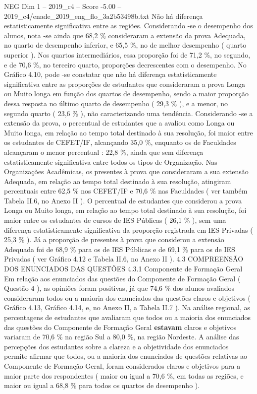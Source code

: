 \begin{textsample}{NEG Dim 1 – 2019\_c4 – Score -5.00 – 2019\_c4/enade\_2019\_eng\_flo\_3a2b53498b.txt}
Não há diferença estatisticamente significativa entre as regiões.
Considerando -se o desempenho dos alunos, nota -se ainda que 68,2 \% consideraram a extensão da prova Adequada, no quarto de desempenho inferior, e 65,5 \%, no de melhor desempenho ( quarto superior ).
Nos quartos intermediários, essa proporção foi de 71,2 \%, no segundo, e de 70,6 \%, no terceiro quarto, proporções decrescentes com o desempenho.
No Gráfico 4.10, pode -se constatar que não há diferença estatisticamente significativa entre as proporções de estudantes que consideraram a prova Longa ou Muito longa em função dos quartos de desempenho, sendo a maior proporção dessa resposta no último quarto de desempenho ( 29,3 \% ), e a menor, no segundo quarto ( 23,6 \% ), não caracterizando uma tendência.
Considerando -se a extensão da prova, o percentual de estudantes que a avaliou como Longa ou Muito longa, em relação ao tempo total destinado à sua resolução, foi maior entre os estudantes de CEFET/IF, alcançando 35,0 \%, enquanto os de Faculdades alcançaram o menor percentual : 22,8 \%, ainda que sem diferença estatisticamente significativa entre todos os tipos de Organização.
Nas Organizações Acadêmicas, os presentes à prova que consideraram a sua extensão Adequada, em relação ao tempo total destinado à sua resolução, atingiram percentuais entre 62,5 \% nos CEFET/IF e 70,6 \% nas Faculdades ( ver também Tabela II.6, no Anexo II ).
O percentual de estudantes que considerou a prova Longa ou Muito longa, em relação ao tempo total destinado à sua resolução, foi maior entre os estudantes de cursos de IES Públicas ( 26,1 \% ), sem uma diferença estatisticamente significativa da proporção registrada em IES Privadas ( 25,3 \% ).
Já a proporção de presentes à prova que considerou a extensão Adequada foi de 68,9 \% para os de IES Públicas e de 69,1 \% para os de IES Privadas ( ver Gráfico 4.12 e Tabela II.6, no Anexo II ). 4.3 COMPREENSÃO DOS ENUNCIADOS DAS QUESTÕES 4.3.1 Componente de Formação Geral Em relação aos enunciados das questões do Componente de Formação Geral ( Questão 4 ), as opiniões foram positivas, já que 74,6 \% dos alunos avaliados consideraram todos ou a maioria dos enunciados das questões claros e objetivos ( Gráfico 4.13, Gráfico 4.14, e, no Anexo II, a Tabela II.7 ).
Na análise regional, as percentagens de estudantes que avaliaram que todos ou a maioria dos enunciados das questões do Componente de Formação Geral \textbf{estavam} claros e objetivos variaram de 70,6 \% na região Sul a 80,0 \%, na região Nordeste.
A análise das percepções dos estudantes sobre a clareza e a objetividade dos enunciados permite afirmar que todos, ou a maioria dos enunciados de questões relativas ao Componente de Formação Geral, foram considerados claros e objetivos para a maior parte dos respondentes ( maior ou igual a 70,6 \%, em todas as regiões, e maior ou igual a 68,8 \% para todos os quartos de desempenho ).

\end{textsample}
